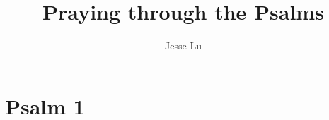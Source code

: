 \documentclass[a5paper]{book}
\title{Praying through the Psalms}
\author{Jesse Lu}
\begin{document}
\maketitle
\chapter*{Psalm 1}
\end{document}
